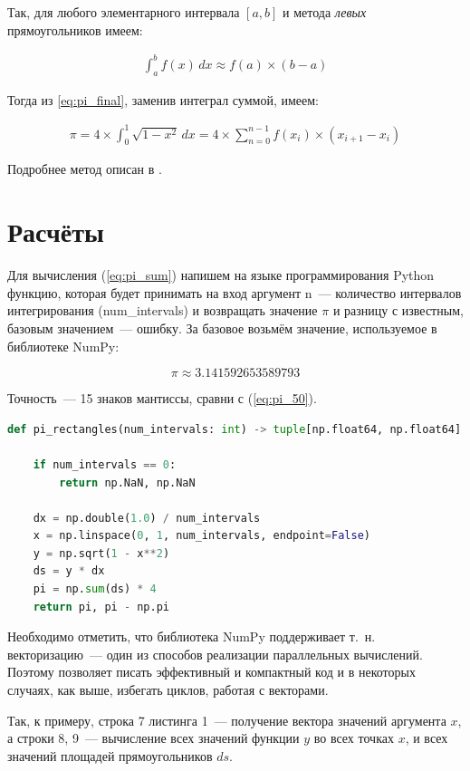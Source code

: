 \documentclass[a4paper,12pt]{article}
\begin{document}
Так, для любого элементарного интервала $[a,b]$ и метода \textit{левых} прямоугольников имеем:

\begin{align}\label{eq:rect_approx}
    \int_{a}^{b} f(x)\,dx \approx f(a)\times (b-a)
\end{align}

Тогда из \ref{eq:pi_final}, заменив интеграл суммой, имеем:

\begin{align}\label{eq:pi_sum}
    \pi = 4 \times \int_{0}^{1} \sqrt{1-x^2} \,dx = 4 \times \sum_{n = 0}^{n-1} f(x_i)\times(x_{i+1}-x_i)
\end{align}

Подробнее метод описан в \cite{rect}.

\section{Расчёты}

Для вычисления (\ref{eq:pi_sum}) напишем на языке программирования Python функцию, которая будет принимать на вход аргумент n~--- количество интервалов интегрирования (num\_intervals) и возвращать значение $\pi$ и разницу с известным, базовым значением~--- ошибку. За базовое возьмём значение, используемое в библиотеке NumPy:

$$\pi \approx 3.141592653589793$$

Точность~--- 15 знаков мантиссы, сравни с (\ref{eq:pi_50}).


\begin{lstlisting}[language=Python, caption=Функция вычисления $\pi$ и ошибки]
def pi_rectangles(num_intervals: int) -> tuple[np.float64, np.float64]:

    if num_intervals == 0:
        return np.NaN, np.NaN
    
    dx = np.double(1.0) / num_intervals
    x = np.linspace(0, 1, num_intervals, endpoint=False)
    y = np.sqrt(1 - x**2)
    ds = y * dx
    pi = np.sum(ds) * 4
    return pi, pi - np.pi    
\end{lstlisting}    

Необходимо отметить, что библиотека NumPy поддерживает т.\ н. векторизацию~--- один из способов реализации параллельных вычислений. Поэтому позволяет писать эффективный и компактный код и в некоторых случаях, как выше, избегать циклов, работая с векторами.

Так, к примеру, строка 7 листинга 1~--- получение вектора значений аргумента $x$, а строки 8, 9~--- вычисление всех значений функции $y$ во всех точках $x$, и всех значений площадей прямоугольников $ds$.
\end{document}
